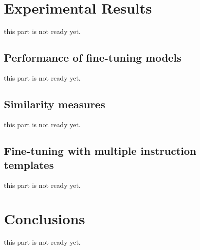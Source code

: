 \documentclass[sigconf]{acmart}
\begin{document}
\section{Experimental Results}\label{results}
this part is not ready yet.





\subsection{Performance of fine-tuning models}
this part is not ready yet.








\subsection{Similarity measures}
this part is not ready yet.





\subsection{Fine-tuning with multiple instruction templates}
this part is not ready yet.




\section{Conclusions}\label{conclusions}
this part is not ready yet.




 
\end{document}

